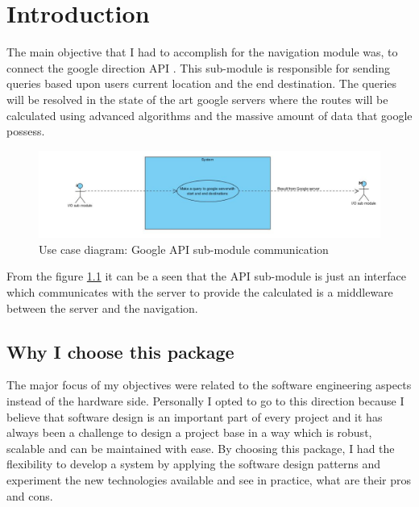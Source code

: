 \newpage
\chapter{Introduction}

	The main objective that I had to accomplish for the navigation module was, to connect the google direction API \cite{googleDirecAPI}. 
	This sub-module is responsible for sending queries based upon users current location and the end destination. 
	The queries will be resolved in the state of the art google servers where the 
	routes will be calculated using advanced algorithms and the massive amount of data that google possess. 

	\begin{figure}[htbp!]
		\centering \includegraphics[scale=0.7]{grafiken/googleServerCommunication.jpg}
		\caption{Use case diagram: Google API sub-module communication}
		\label{fig:Google API communication}
	\end{figure}

	\par
	From the figure \ref{fig:Google API communication} it can be a seen that the API sub-module is 
	just an interface which communicates with the server to provide the calculated is a 
	middleware between the server and the navigation. 
	
	\section{Why I choose this package}
	The major focus of my objectives were related to the software engineering aspects instead of
	the hardware side. Personally I opted to go to this direction because I believe that software
	design is an important part of every project and it has always been a challenge to design a project base
	in a way which is robust, scalable and can be maintained with ease. By choosing this package,
	I had the flexibility to develop a system by applying the software design patterns and experiment the new
	technologies available and see in practice, what are their pros and cons.     